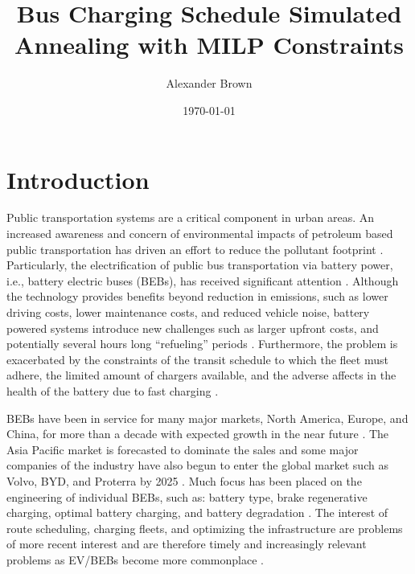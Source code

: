 \documentclass[11pt,a4paper,final]{article}
\author{Alexander Brown}
\date{\today}
\title{Bus Charging Schedule Simulated Annealing with MILP Constraints}
\begin{document}
\maketitle
\tableofcontents

\parskip 3mm                                %
\let\ref\autoref                            %

\section{Introduction}
\label{sec:introduction}
Public transportation systems are a critical component in urban areas. An increased awareness and concern of
environmental impacts of petroleum based public transportation has driven an effort to reduce the pollutant footprint
\cite{de-2014-simul-elect,xylia-2018-role-charg,guida-2017-zeeus-repor-europ,li-2016-batter-elect}. Particularly,
the electrification of public bus transportation via battery power, i.e., battery electric buses (BEBs), has received
significant attention \cite{li-2016-batter-elect}. Although the technology provides benefits beyond reduction in
emissions, such as lower driving costs, lower maintenance costs, and reduced vehicle noise, battery powered systems
introduce new challenges such as larger upfront costs, and potentially several hours long ``refueling'' periods
\cite{xylia-2018-role-charg,li-2016-batter-elect}. Furthermore, the problem is exacerbated by the constraints of the
transit schedule to which the fleet must adhere, the limited amount of chargers available, and the adverse affects in
the health of the battery due to fast charging \cite{lutsey-2019-updat-elect}.

BEBs have been in service for many major markets, North America, Europe, and China, for more than a decade with expected
growth in the near future \cite{deng-2021-survey-elect}. The Asia Pacific market is forecasted to dominate the sales
and some major companies of the industry have also begun to enter the global market such as Volvo, BYD, and Proterra by
2025 \cite{deng-2021-survey-elect}. Much focus has been placed on the engineering of individual BEBs, such as: battery
type, brake regenerative charging, optimal battery charging, and battery degradation \cite{chen-2008-desig-grey,abdollahi-2016-optim-batter,kuhne-2010-elect,deng-2021-survey-elect}. The interest of route scheduling, charging
fleets, and optimizing the infrastructure are problems of more recent interest and are therefore timely and increasingly
relevant problems as EV/BEBs become more commonplace \cite{hoke-2014-accoun-lithium,sebastiani-2016-evaluat-elect,wei-2018-optim-spatio}.
\end{document}
